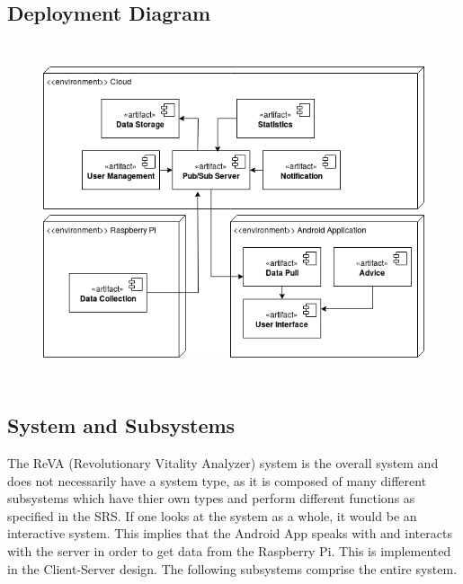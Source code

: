 \subsection{Deployment Diagram}
\begin{center}
\begin{figure}[h]
	\includegraphics[width=15cm, height=10cm]{OverallDescription/DeploymentDiagram.png}
\end{figure}
\end{center}

\subsection{System and Subsystems}
	The ReVA (Revolutionary Vitality Analyzer) system is the overall system and does not necessarily have a system type, as it is composed of many different subsystems which have thier own types and perform different functions as specified in the SRS. If one looks at the system as a whole, it would be an interactive system. This implies that the Android App speaks with and interacts with the server in order to get data from the Raspberry Pi. This is implemented in the Client-Server design. The following subsystems comprise the entire system.

